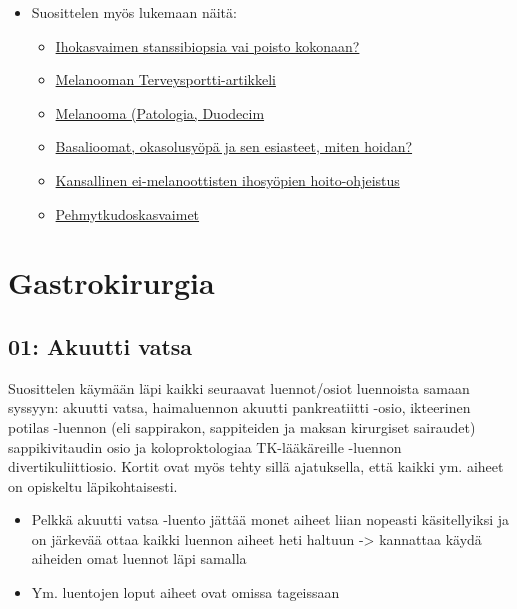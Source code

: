 \documentclass[
]{book}
\providecommand{\tightlist}{%
  \setlength{\itemsep}{0pt}\setlength{\parskip}{0pt}}
\begin{document}
\begin{itemize}
\item
  Suosittelen myös lukemaan näitä:

  \begin{itemize}
  \tightlist
  \item
    \href{https://www.terveysportti.fi/apps/dtk/ltk/article/duo18406/}{Ihokasvaimen stanssibiopsia vai poisto kokonaan?}
  \item
    \href{https://www.terveysportti.fi/apps/dtk/ltk/article/ykt01386/}{Melanooman Terveysportti-artikkeli}
  \item
    \href{https://www.oppiportti.fi/oppikirjat/pat00688}{Melanooma (Patologia, Duodecim}
  \item
    \href{https://www.terveysportti.fi/apps/dtk/ltk/article/duo11556/}{Basalioomat, okasolusyöpä ja sen esiasteet, miten hoidan?}
  \item
    \href{https://www.terveysportti.fi/apps/dtk/ltk/article/hsu00009}{Kansallinen ei-melanoottisten ihosyöpien hoito-ohjeistus}
  \item
    \href{https://www.oppiportti.fi/oppikirjat/pat00763}{Pehmytkudoskasvaimet}
  \end{itemize}
\end{itemize}

\section{Gastrokirurgia}\label{gastrokirurgia}

\subsection{01: Akuutti vatsa}\label{akuutti-vatsa}

Suosittelen käymään läpi kaikki seuraavat luennot/osiot luennoista samaan syssyyn: akuutti vatsa, haimaluennon akuutti pankreatiitti -osio, ikteerinen potilas -luennon (eli sappirakon, sappiteiden ja maksan kirurgiset sairaudet) sappikivitaudin osio ja koloproktologiaa TK-lääkäreille -luennon divertikuliittiosio. Kortit ovat myös tehty sillä ajatuksella, että kaikki ym. aiheet on opiskeltu läpikohtaisesti.

\begin{itemize}
\item
  Pelkkä akuutti vatsa -luento jättää monet aiheet liian nopeasti käsitellyiksi ja on järkevää ottaa kaikki luennon aiheet heti haltuun -\textgreater{} kannattaa käydä aiheiden omat luennot läpi samalla
\item
  Ym. luentojen loput aiheet ovat omissa tageissaan
\end{itemize}
\end{document}
